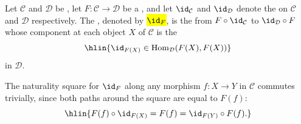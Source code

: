 \begin{definition} \label{definition:identity_natural_transformation_of_a_functor_between_categories}
    Let $\mathcal{C}$ and $\mathcal{D}$ be , let $F \colon \mathcal{C} \to \mathcal{D}$ be a , and let $\id_{\mathcal{C}}$ and $\id_{\mathcal{D}}$ denote the  on $\mathcal{C}$ and $\mathcal{D}$ respectively. The , denoted by \hl{$\id_F$}, is the  from $F \circ \id_{\mathcal{C}}$ to $\id_{\mathcal{D}} \circ F$ whose component at each object $X$ of $\mathcal{C}$ is the 
    $$\hlin{\id_{F(X)} \in \operatorname{Hom}_{\mathcal{D}}(F(X), F(X))}$$
    in $\mathcal{D}$.

    The naturality square for $\id_F$ along any morphism $f \colon X \to Y$ in $\mathcal{C}$ commutes trivially, since both paths around the square are equal to $F(f)$:
    $$\hlin{F(f) \circ \id_{F(X)} = F(f) = \id_{F(Y)} \circ F(f).}$$

\end{definition}
